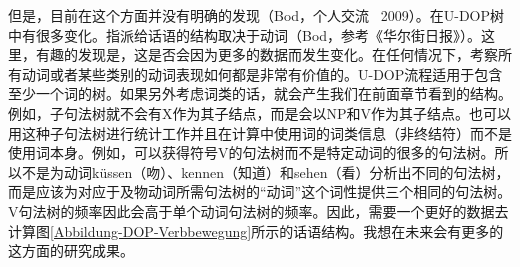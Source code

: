 \begin{exe}
\begin{xlist}[iv.]
\begin{exe}
\begin{xlist}[iv.]
\begin{figure}
\end{figure}%
但是，目前在这个方面并没有明确的发现（Bod，个人交流 \, 2009）。在U-DOP树中有很多变化。指派给话语的结构取决于动词（Bod，参考《华尔街日报》）。这里，有趣的发现是，这是否会因为更多的数据而发生变化。在任何情况下，考察所有动词或者某些类别的动词表现如何都是非常有价值的。U-DOP流程适用于包含至少一个词的树。如果另外考虑词类的话，就会产生我们在前面章节看到的结构。例如，子句法树就不会有X作为其子结点，而是会以NP和V作为其子结点。也可以用这种子句法树进行统计工作并且在计算中使用词的词类信息（非终结符）而不是使用词本身。例如，可以获得符号V的句法树而不是特定动词的很多的句法树。所以不是为动词küssen（吻）、kennen（知道）和sehen（看）分析出不同的句法树，而是应该为对应于及物动词所需句法树的“动词”这个词性提供三个相同的句法树。V句法树的频率因此会高于单个动词句法树的频率。因此，需要一个更好的数据去计算图\ref{Abbildung-DOP-Verbbewegung}所示的话语结构。我想在未来会有更多的这方面的研究成果。


\end{xlist}
\end{exe}
\end{xlist}
\end{exe}
